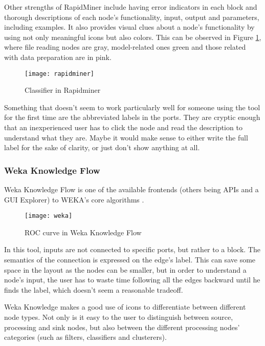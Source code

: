 Other strengths of RapidMiner include having error indicators in each block
and thorough descriptions of each
node's functionality, input, output and parameters, including examples. It also
provides visual clues about a node's functionality by using not only meaningful
icons but also colors. This can be observed in Figure \ref{fig:rapidminer},
where file reading nodes are gray, model-related ones green and those related
with data preparation are in pink.

\begin{figure}[t]
  \begin{center}
    \leavevmode
    \texttt{[image: rapidminer]}
    \caption{Classifier in Rapidminer \cite{rapidminer}}
    \label{fig:rapidminer}
  \end{center}
\end{figure}

Something that doesn't seem to work particularly well for someone using the tool
for the first time are the abbreviated labels in the ports. They are cryptic
enough that an inexperienced user has to click the node and read the description
to understand what they are. Maybe it would make sense to either write the full
label for the sake of clarity, or just don't show anything at all.

\subsubsection{Weka Knowledge Flow}

Weka Knowledge Flow is one of the available frontends (others being APIs and a GUI Explorer)
to WEKA's core algorithms \cite{weka}.

\begin{figure}[t]
  \begin{center}
    \leavevmode
    \texttt{[image: weka]}
    \caption{ROC curve in Weka Knowledge Flow \cite{weka}}
    \label{fig:weka}
  \end{center}
\end{figure}

In this tool, inputs are not connected to specific ports, but rather to a block.
The semantics of the connection is expressed on the edge's label. This can save
some space in the layout as the nodes can be smaller, but in order to understand
a node's input, the user has to waste time following all the edges backward
until he finds the label, which doesn't seem a reasonable tradeoff.

Weka Knowledge makes a good use of icons to differentiate between different node
types. Not only is it easy to the user to distinguish between source, processing
and sink nodes, but also between the different processing nodes' categories
(such as filters, classifiers and clusterers).

